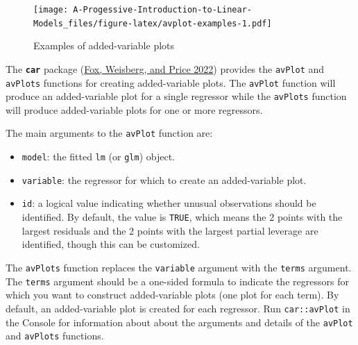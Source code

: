 \documentclass[
]{book}
\theoremstyle{definition}
\theoremstyle{definition}
\theoremstyle{definition}
\theoremstyle{definition}
\theoremstyle{remark}
\begin{document}
\begin{figure}
\centering
\texttt{[image: A-Progessive-Introduction-to-Linear-Models\_files/figure-latex/avplot-examples-1.pdf]}
\caption{\label{fig:avplot-examples}Examples of added-variable plots}
\end{figure}

The \textbf{\texttt{car}} package (\protect\hyperlink{ref-R-car}{Fox, Weisberg, and Price 2022}) provides the \texttt{avPlot} and \texttt{avPlots}
functions for creating added-variable plots. The \texttt{avPlot} function will
produce an added-variable plot for a single regressor while the
\texttt{avPlots} function will produce added-variable plots for one or more
regressors.

The main arguments to the \texttt{avPlot} function are:

\begin{itemize}
\item
  \texttt{model}: the fitted \texttt{lm} (or \texttt{glm}) object.
\item
  \texttt{variable}: the regressor for which to create an added-variable
  plot.
\item
  \texttt{id}: a logical value indicating whether unusual observations should
  be identified. By default, the value is \texttt{TRUE}, which means the 2
  points with the largest residuals and the 2 points with the largest
  partial leverage are identified, though this can be customized.
\end{itemize}

The \texttt{avPlots} function replaces the \texttt{variable} argument with the \texttt{terms}
argument. The \texttt{terms} argument should be a one-sided formula to indicate
the regressors for which you want to construct added-variable plots (one
plot for each term). By default, an added-variable plot is created for
each regressor. Run \texttt{car::avPlot} in the Console for information about
about the arguments and details of the \texttt{avPlot} and \texttt{avPlots} functions.
\end{document}
